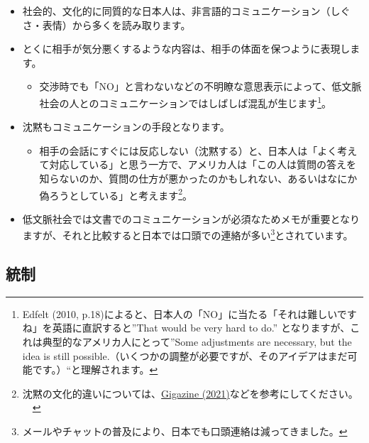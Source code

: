 \documentclass[
]{book}
\providecommand{\tightlist}{%
  \setlength{\itemsep}{0pt}\setlength{\parskip}{0pt}}
\begin{document}
\begin{itemize}
  \begin{itemize}
  \item
    社会的、文化的に同質的な日本人は、非言語的コミュニケーション（しぐさ・表情）から多くを読み取ります。
  \item
    とくに相手が気分悪くするような内容は、相手の体面を保つように表現します。

    \begin{itemize}
    \tightlist
    \item
      交渉時でも「NO」と言わないなどの不明瞭な意思表示によって、低文脈社会の人とのコミュニケーションではしばしば混乱が生じます\footnote{Edfelt (2010, p.18)によると、日本人の「NO」に当たる「それは難しいですね」を英語に直訳すると''That would be very hard to do.'' となりますが、これは典型的なアメリカ人にとって''Some adjustments are necessary, but the idea is still possible.（いくつかの調整が必要ですが、そのアイデアはまだ可能です。）``と理解されます。}。
    \end{itemize}
  \item
    沈黙もコミュニケーションの手段となります。

    \begin{itemize}
    \tightlist
    \item
      相手の会話にすぐには反応しない（沈黙する）と、日本人は「よく考えて対応している」と思う一方で、アメリカ人は「この人は質問の答えを知らないのか、質問の仕方が悪かったのかもしれない、あるいはなにか偽ろうとしている」と考えます\footnote{沈黙の文化的違いについては、\href{https://gigazine.net/news/20210723-cultural-implications-silence/}{Gigazine (2021)}などを参考にしてください。
        　}。
    \end{itemize}
  \item
    低文脈社会では文書でのコミュニケーションが必須なためメモが重要となりますが、それと比較すると日本では口頭での連絡が多い\footnote{メールやチャットの普及により、日本でも口頭連絡は減ってきました。}とされています。
  \end{itemize}
\end{itemize}

\hypertarget{japan-control}{%
\subsection{統制}\label{japan-control}}
\end{document}
